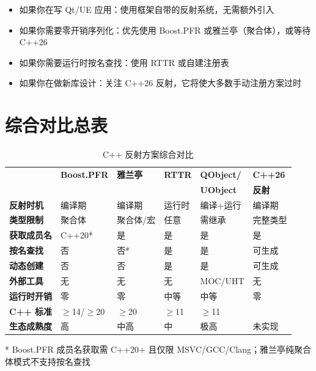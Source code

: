 \documentclass[12pt,a4paper,fontset=fandol]{ctexbook}
\begin{document}
\begin{note}[title={选择建议}]
\begin{itemize}[nosep]
  \item 如果你在写 Qt/UE 应用：使用框架自带的反射系统，无需额外引入
  \item 如果你需要零开销序列化：优先使用 Boost.PFR 或雅兰亭（聚合体），或等待 C++26
  \item 如果你需要运行时按名查找：使用 RTTR 或自建注册表
  \item 如果你在做新库设计：关注 C++26 反射，它将使大多数手动注册方案过时
\end{itemize}
\end{note}

\section{综合对比总表}\label{sec:summary}

\begin{table}[H]
\centering
\caption{C++ 反射方案综合对比}
\small
\setlength{\tabcolsep}{4pt}
\begin{tabular}{
  >{\raggedright\arraybackslash}p{2.5cm}
  >{\centering\arraybackslash}p{2.2cm}
  >{\centering\arraybackslash}p{2.2cm}
  >{\centering\arraybackslash}p{2.2cm}
  >{\centering\arraybackslash}p{2.2cm}
  >{\centering\arraybackslash}p{2.2cm}
}
\toprule
 & \textbf{Boost.PFR} & \textbf{雅兰亭} & \textbf{RTTR} & \textbf{QObject/} & \textbf{C++26} \\
 & & & & \textbf{UObject} & \textbf{反射} \\
\midrule
\textbf{反射时机} & 编译期 & 编译期 & 运行时 & 编译+运行 & 编译期 \\
\textbf{类型限制} & 聚合体 & 聚合体/宏 & 任意 & 需继承 & 完整类型 \\
\textbf{获取成员名} & C++20* & 是 & 是 & 是 & 是 \\
\textbf{按名查找} & 否 & 否* & 是 & 是 & 可生成 \\
\textbf{动态创建} & 否 & 否 & 是 & 是 & 可生成 \\
\textbf{外部工具} & 无 & 无 & 无 & MOC/UHT & 无 \\
\textbf{运行时开销} & 零 & 零 & 中等 & 中等 & 零 \\
\textbf{C++ 标准} & $\ge$14/$\ge$20 & $\ge$20 & $\ge$11 & $\ge$11 & 26 \\
\textbf{生态成熟度} & 高 & 中高 & 中 & 极高 & 未实现 \\
\bottomrule
\end{tabular}

\vspace{4pt}
\footnotesize{* Boost.PFR 成员名获取需 C++20+ 且仅限 MSVC/GCC/Clang；雅兰亭纯聚合体模式不支持按名查找}
\end{table}
\end{document}
